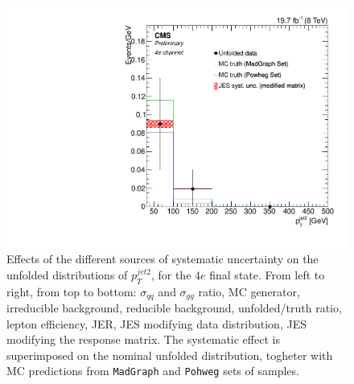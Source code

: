 \begin{figure}[hbtp]
\begin{center}
   \includegraphics[width=0.8\cmsFigWidth]{Figures/Unfolding/Systematics/ZZTo4e_PtJet2_JES_ModMat_Mad_fr}
   \caption{Effects of the different sources of systematic uncertainty on the unfolded distributions of  $p_{T}^{jet2}$, for the     
   $4e$ final state. From left to right, from top to bottom: $\sigma_{qq}$ and $\sigma_{gg}$ ratio, MC generator, irreducible background, reducible background, unfolded/truth ratio, lepton efficiency, JER, JES modifying data distribution, JES modifying the response matrix. The systematic effect is superimposed on the nominal unfolded distribution, togheter with MC predictions from \texttt{MadGraph} and \texttt{Pohweg} sets of samples.}
   \label{fig:PtJet2_syst_4e}
 \end{center}
\end{figure}

